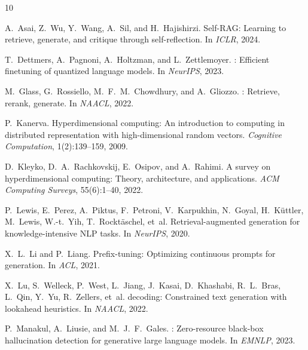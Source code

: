 \documentclass[11pt,a4paper]{article}
\begin{document}
\begin{thebibliography}{10}

A.~Asai, Z.~Wu, Y.~Wang, A.~Sil, and H.~Hajishirzi.
\newblock Self-{RAG}: Learning to retrieve, generate, and critique through
  self-reflection.
\newblock In \emph{ICLR}, 2024.

T.~Dettmers, A.~Pagnoni, A.~Holtzman, and L.~Zettlemoyer.
: Efficient finetuning of quantized language models.
\newblock In \emph{NeurIPS}, 2023.

M.~Glass, G.~Rossiello, M.~F.~M.~Chowdhury, and A.~Gliozzo.
: Retrieve, rerank, generate.
\newblock In \emph{NAACL}, 2022.

P.~Kanerva.
\newblock Hyperdimensional computing: An introduction to computing in
  distributed representation with high-dimensional random vectors.
\newblock \emph{Cognitive Computation}, 1(2):139--159, 2009.

D.~Kleyko, D.~A.~Rachkovskij, E.~Osipov, and A.~Rahimi.
\newblock A survey on hyperdimensional computing: Theory, architecture, and
  applications.
\newblock \emph{ACM Computing Surveys}, 55(6):1--40, 2022.

P.~Lewis, E.~Perez, A.~Piktus, F.~Petroni, V.~Karpukhin, N.~Goyal,
  H.~K{\"u}ttler, M.~Lewis, W.-t.~Yih, T.~Rockt{\"a}schel, et~al.
\newblock Retrieval-augmented generation for knowledge-intensive {NLP} tasks.
\newblock In \emph{NeurIPS}, 2020.

X.~L.~Li and P.~Liang.
\newblock Prefix-tuning: Optimizing continuous prompts for generation.
\newblock In \emph{ACL}, 2021.

X.~Lu, S.~Welleck, P.~West, L.~Jiang, J.~Kasai, D.~Khashabi, R.~L.~Bras,
  L.~Qin, Y.~Yu, R.~Zellers, et~al.
 decoding: Constrained text generation with
  lookahead heuristics.
\newblock In \emph{NAACL}, 2022.

P.~Manakul, A.~Liusie, and M.~J.~F.~Gales.
: Zero-resource black-box hallucination detection for
  generative large language models.
\newblock In \emph{EMNLP}, 2023.


\end{thebibliography}
\end{document}
